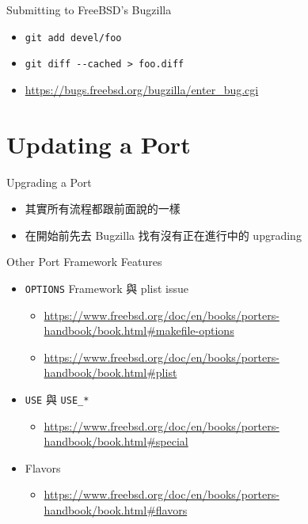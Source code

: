 \documentclass[aspectratio=169]{beamer}
\begin{document}
\begin{frame}[t,fragile]{Submitting to FreeBSD's Bugzilla}
  \begin{itemize}
    \item \verb`git add devel/foo`
    \item \verb`git diff --cached > foo.diff`
    \item \href{https://bugs.freebsd.org/bugzilla/enter_bug.cgi}{https://bugs.freebsd.org/bugzilla/enter\_bug.cgi}
  \end{itemize}
\end{frame}

\section{Updating a Port}
\begin{frame}[t,fragile]{Upgrading a Port}
  \begin{itemize}
    \item 其實所有流程都跟前面說的一樣
    \item 在開始前先去 Bugzilla 找有沒有正在進行中的 upgrading
  \end{itemize}
\end{frame}

\begin{frame}[t,fragile]{Other Port Framework Features}
  \begin{itemize}
    \item \verb`OPTIONS` Framework 與 plist issue
      \begin{itemize}
        \item \href{https://www.freebsd.org/doc/en/books/porters-handbook/book.html#makefile-options}{https://www.freebsd.org/doc/en/books/porters-handbook/book.html\#makefile-options}
        \item \href{https://www.freebsd.org/doc/en/books/porters-handbook/book.html#plist}{https://www.freebsd.org/doc/en/books/porters-handbook/book.html\#plist}
      \end{itemize}
    \item \verb`USE` 與 \verb`USE_*`
      \begin{itemize}
        \item \href{https://www.freebsd.org/doc/en/books/porters-handbook/book.html#special}{https://www.freebsd.org/doc/en/books/porters-handbook/book.html\#special}
      \end{itemize}
    \item Flavors
      \begin{itemize}
        \item \href{https://www.freebsd.org/doc/en/books/porters-handbook/book.html#flavors}{https://www.freebsd.org/doc/en/books/porters-handbook/book.html\#flavors}
      \end{itemize}
  \end{itemize}
\end{frame}
\end{document}
